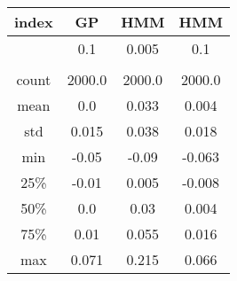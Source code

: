 \centering \begin{tabular}{c|c|c|c}
index	&GP	&HMM	&HMM\\\hline
	&0.1	&0.005	&0.1\\
	&	&	&\\
count	&2000.0	&2000.0	&2000.0\\
mean	&0.0	&0.033	&0.004\\
std	&0.015	&0.038	&0.018\\
min	&-0.05	&-0.09	&-0.063\\
25\%	&-0.01	&0.005	&-0.008\\
50\%	&0.0	&0.03	&0.004\\
75\%	&0.01	&0.055	&0.016\\
max	&0.071	&0.215	&0.066\\
\end{tabular}
